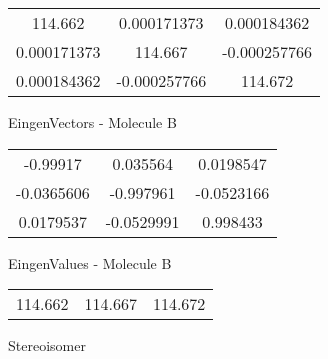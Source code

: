 \begin{multicols}{2}
\begin{center}
\begin{tabular}{|c c c|}
114.662	 & 	0.000171373	 & 	0.000184362	 \\
0.000171373	 & 	114.667	 & 	-0.000257766	 \\
0.000184362	 & 	-0.000257766	 & 	114.672
\end{tabular}

\vtab
 EingenVectors - Molecule B     \\
\vtab
\begin{tabular}{|c c c|}
-0.99917	 & 	0.035564	 & 	0.0198547	 \\
-0.0365606	 & 	-0.997961	 & 	-0.0523166	 \\
0.0179537	 & 	-0.0529991	 & 	0.998433
\end{tabular}

\vtab
 EingenValues - Molecule B     \\
\vtab
\begin{tabular}{|c c c|}
114.662	 & 	114.667	 & 	114.672	 \\
\end{tabular}

\end{center}
\end{multicols}
\begin{center}
\vtab
\vtab
\textcolor{NavyBlue}{\Large Stereoisomer}
\end{center}

 \newpage

